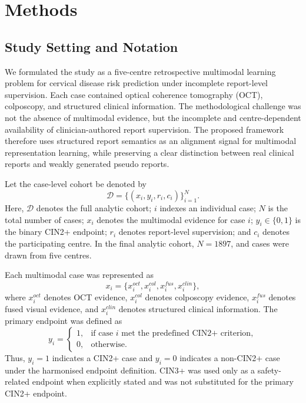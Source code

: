 \section{Methods}
\label{sec:methods}

\subsection{Study Setting and Notation}
\label{subsec:methods_design}

We formulated the study as a five-centre retrospective multimodal learning problem for cervical disease risk prediction under incomplete report-level supervision. Each case contained optical coherence tomography (OCT), colposcopy, and structured clinical information. The methodological challenge was not the absence of multimodal evidence, but the incomplete and centre-dependent availability of clinician-authored report supervision. The proposed framework therefore uses structured report semantics as an alignment signal for multimodal representation learning, while preserving a clear distinction between real clinical reports and weakly generated pseudo reports.

Let the case-level cohort be denoted by
\begin{equation}
\mathcal{D}=\{(x_i,y_i,r_i,c_i)\}_{i=1}^{N}.
\label{eq:cohort}
\end{equation}
Here, \(\mathcal{D}\) denotes the full analytic cohort; \(i\) indexes an individual case; \(N\) is the total number of cases; \(x_i\) denotes the multimodal evidence for case \(i\); \(y_i\in\{0,1\}\) is the binary CIN2+ endpoint; \(r_i\) denotes report-level supervision; and \(c_i\) denotes the participating centre. In the final analytic cohort, \(N=1897\), and cases were drawn from five centres.

Each multimodal case was represented as
\begin{equation}
x_i=\{x_i^{oct},x_i^{col},x_i^{fus},x_i^{clin}\},
\label{eq:case_modalities}
\end{equation}
where \(x_i^{oct}\) denotes OCT evidence, \(x_i^{col}\) denotes colposcopy evidence, \(x_i^{fus}\) denotes fused visual evidence, and \(x_i^{clin}\) denotes structured clinical information. The primary endpoint was defined as
\begin{equation}
y_i=
\begin{cases}
1, & \text{if case }i\text{ met the predefined CIN2+ criterion},\\
0, & \text{otherwise}.
\end{cases}
\label{eq:cin2_endpoint}
\end{equation}
Thus, \(y_i=1\) indicates a CIN2+ case and \(y_i=0\) indicates a non-CIN2+ case under the harmonised endpoint definition. CIN3+ was used only as a safety-related endpoint when explicitly stated and was not substituted for the primary CIN2+ endpoint.

